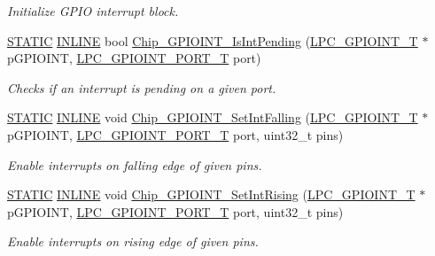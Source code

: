 \begin{DoxyCompactItemize}
\begin{DoxyCompactList}\small\item\em Initialize G\+P\+IO interrupt block. \end{DoxyCompactList}\item 
\hyperlink{group__LPC__Types__Public__Macros_ga10b2d890d871e1489bb02b7e70d9bdfb}{S\+T\+A\+T\+IC} \hyperlink{group__LPC__Types__Public__Types_ga2eb6f9e0395b47b8d5e3eeae4fe0c116}{I\+N\+L\+I\+NE} bool \hyperlink{group__GPIOINT__17XX__40XX_gafd07acaafc8dda672add325845939fa3}{Chip\+\_\+\+G\+P\+I\+O\+I\+N\+T\+\_\+\+Is\+Int\+Pending} (\hyperlink{structLPC__GPIOINT__T}{L\+P\+C\+\_\+\+G\+P\+I\+O\+I\+N\+T\+\_\+T} $\ast$p\+G\+P\+I\+O\+I\+NT, \hyperlink{group__GPIOINT__17XX__40XX_ga41631ac5e33fde341c0afe680ded9fee}{L\+P\+C\+\_\+\+G\+P\+I\+O\+I\+N\+T\+\_\+\+P\+O\+R\+T\+\_\+T} port)
\begin{DoxyCompactList}\small\item\em Checks if an interrupt is pending on a given port. \end{DoxyCompactList}\item 
\hyperlink{group__LPC__Types__Public__Macros_ga10b2d890d871e1489bb02b7e70d9bdfb}{S\+T\+A\+T\+IC} \hyperlink{group__LPC__Types__Public__Types_ga2eb6f9e0395b47b8d5e3eeae4fe0c116}{I\+N\+L\+I\+NE} void \hyperlink{group__GPIOINT__17XX__40XX_ga59d69f2c748bc4816268a7b4714f8058}{Chip\+\_\+\+G\+P\+I\+O\+I\+N\+T\+\_\+\+Set\+Int\+Falling} (\hyperlink{structLPC__GPIOINT__T}{L\+P\+C\+\_\+\+G\+P\+I\+O\+I\+N\+T\+\_\+T} $\ast$p\+G\+P\+I\+O\+I\+NT, \hyperlink{group__GPIOINT__17XX__40XX_ga41631ac5e33fde341c0afe680ded9fee}{L\+P\+C\+\_\+\+G\+P\+I\+O\+I\+N\+T\+\_\+\+P\+O\+R\+T\+\_\+T} port, uint32\+\_\+t pins)
\begin{DoxyCompactList}\small\item\em Enable interrupts on falling edge of given {\itshape pins}. \end{DoxyCompactList}\item 
\hyperlink{group__LPC__Types__Public__Macros_ga10b2d890d871e1489bb02b7e70d9bdfb}{S\+T\+A\+T\+IC} \hyperlink{group__LPC__Types__Public__Types_ga2eb6f9e0395b47b8d5e3eeae4fe0c116}{I\+N\+L\+I\+NE} void \hyperlink{group__GPIOINT__17XX__40XX_ga50cbadb361acd7190dc8edf5ffb9208c}{Chip\+\_\+\+G\+P\+I\+O\+I\+N\+T\+\_\+\+Set\+Int\+Rising} (\hyperlink{structLPC__GPIOINT__T}{L\+P\+C\+\_\+\+G\+P\+I\+O\+I\+N\+T\+\_\+T} $\ast$p\+G\+P\+I\+O\+I\+NT, \hyperlink{group__GPIOINT__17XX__40XX_ga41631ac5e33fde341c0afe680ded9fee}{L\+P\+C\+\_\+\+G\+P\+I\+O\+I\+N\+T\+\_\+\+P\+O\+R\+T\+\_\+T} port, uint32\+\_\+t pins)
\begin{DoxyCompactList}\small\item\em Enable interrupts on rising edge of given {\itshape pins}. \end{DoxyCompactList}\end{DoxyCompactItemize}


